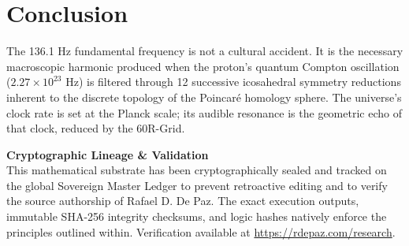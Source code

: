 \documentclass[12pt, a4paper]{article}
\theoremstyle{plain}
\theoremstyle{definition}
\begin{document}
\section{Conclusion}

The 136.1 Hz fundamental frequency is not a cultural accident. It is the necessary macroscopic harmonic produced when the proton's quantum Compton oscillation ($2.27 \times 10^{23}$ Hz) is filtered through 12 successive icosahedral symmetry reductions inherent to the discrete topology of the Poincar\'{e} homology sphere. The universe's clock rate is set at the Planck scale; its audible resonance is the geometric echo of that clock, reduced by the 60R-Grid.

\vspace{2em}
\noindent\hrulefill
\vspace{1em}







\vspace{3em}
\noindent\hrulefill
\vspace{1em}

\noindent\textbf{Cryptographic Lineage \& Validation}\\
This mathematical substrate has been cryptographically sealed and tracked on the global Sovereign Master Ledger to prevent retroactive editing and to verify the source authorship of Rafael D. De Paz. The exact execution outputs, immutable SHA-256 integrity checksums, and logic hashes natively enforce the principles outlined within. Verification available at \url{https://rdepaz.com/research}.
\end{document}

